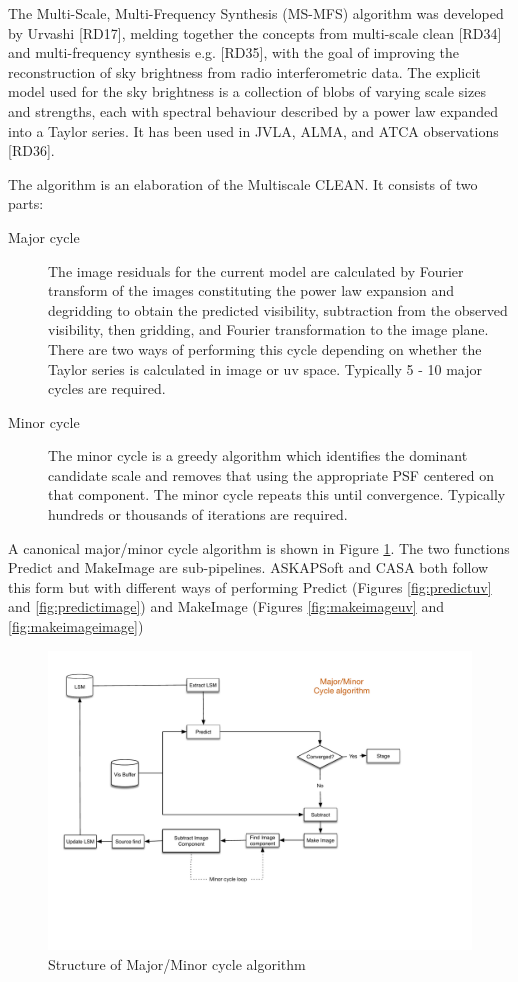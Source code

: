 \documentclass[11pt,a4paper,variablewidth]{article}
\begin{document}
The Multi-Scale, Multi-Frequency Synthesis (MS-MFS) algorithm was developed by Urvashi [RD17], melding together the concepts from multi-scale clean [RD34] and multi-frequency synthesis e.g. [RD35], with the goal of improving the reconstruction of sky brightness from radio interferometric data. The explicit model used for the sky brightness is a collection of blobs of varying scale sizes and strengths, each with spectral behaviour described by a power law expanded into a Taylor series. It has been used in JVLA, ALMA, and ATCA observations [RD36].

The algorithm is an elaboration of the Multiscale CLEAN. It consists of two parts:
\begin{description}
\item[Major cycle] The image residuals for the current model are calculated by Fourier transform of the images constituting the power law expansion and degridding to obtain the predicted visibility, subtraction from the observed visibility, then gridding, and Fourier transformation to the image plane. There are two ways of performing this cycle depending on whether the Taylor series is calculated in image or uv space. Typically 5 - 10 major cycles are required.
\item[Minor cycle] The minor cycle is a greedy algorithm which identifies the dominant candidate scale and removes that using the appropriate PSF centered on that component. The minor cycle repeats this until convergence. Typically hundreds or thousands of iterations are required.
\end{description}

A canonical major/minor cycle algorithm is shown in Figure \ref{fig:majorminor}. The two functions Predict and MakeImage are sub-pipelines. ASKAPSoft and CASA both follow this form but with different ways of performing Predict (Figures \ref{fig:predictuv} and \ref{fig:predictimage}) and MakeImage (Figures \ref{fig:makeimageuv} and \ref{fig:makeimageimage})

\begin{figure}[htb]
  \centering
  \includegraphics[width=\textwidth]{./MSMFS_MajorMinor.pdf}
  \caption{Structure of Major/Minor cycle algorithm}
  \label{fig:majorminor}
\end{figure}
\end{document}

